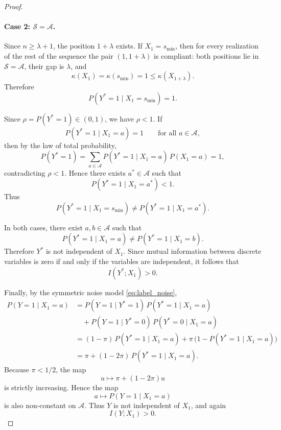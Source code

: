 \documentclass{article}
\theoremstyle{plain}
\theoremstyle{definition}
\theoremstyle{remark}
\begin{document}
\begin{proof}
\paragraph{Case 2: $\mathcal{S}=\mathcal{A}$.}
Since $n\ge \lambda+1$, the position $1+\lambda$ exists.
If $X_1=s_{\min}$, then for every realization of the rest of the sequence
the pair $(1,1+\lambda)$ is compliant: both positions lie in
$\mathcal{S}=\mathcal{A}$, their gap is $\lambda$, and
\[
\kappa(X_1)=\kappa(s_{\min})=1
\le
\kappa(X_{1+\lambda}).
\]
Therefore
\[
P(Y^*=1\mid X_1=s_{\min})=1.
\]

Since $\rho=P(Y^*=1)\in(0,1)$, we have $\rho<1$.
If
\[
P(Y^*=1\mid X_1=a)=1
\qquad
\text{for all } a\in\mathcal{A},
\]
then by the law of total probability,
\[
P(Y^*=1)
=
\sum_{a\in\mathcal{A}}
P(Y^*=1\mid X_1=a)\,P(X_1=a)
=
1,
\]
contradicting $\rho<1$. Hence there exists $a^*\in\mathcal{A}$ such that
\[
P(Y^*=1\mid X_1=a^*)<1.
\]
Thus
\[
P(Y^*=1\mid X_1=s_{\min})
\neq
P(Y^*=1\mid X_1=a^*).
\]

In both cases, there exist $a,b\in\mathcal{A}$ such that
\[
P(Y^*=1\mid X_1=a)\neq P(Y^*=1\mid X_1=b).
\]
Therefore $Y^*$ is not independent of $X_1$. Since mutual information
between discrete variables is zero if and only if the variables are
independent, it follows that
\[
I(Y^*;X_1)>0.
\]

Finally, by the symmetric noise model \eqref{eq:label_noise},
\begin{align*}
P(Y=1\mid X_1=a)
&=
P(Y=1\mid Y^*=1)\,P(Y^*=1\mid X_1=a)
\\
&\quad
+
P(Y=1\mid Y^*=0)\,P(Y^*=0\mid X_1=a)
\\
&=
(1-\pi)\,P(Y^*=1\mid X_1=a)
+
\pi\,\bigl(1-P(Y^*=1\mid X_1=a)\bigr)
\\
&=
\pi + (1-2\pi)\,P(Y^*=1\mid X_1=a).
\end{align*}
Because $\pi<1/2$, the map
\[
u \longmapsto \pi + (1-2\pi)u
\]
is strictly increasing. Hence the map
\[
a \longmapsto P(Y=1\mid X_1=a)
\]
is also non-constant on $\mathcal{A}$. Thus $Y$ is not independent of $X_1$,
and again
\[
I(Y;X_1)>0.
\]
\end{proof}
\end{document}
